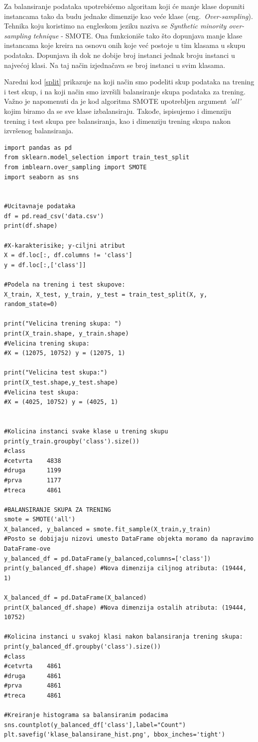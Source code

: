 \documentclass[a4paper]{article}
\begin{document}
Za balansiranje podataka upotrebićemo algoritam koji će manje klase dopuniti instancama tako da budu jednake dimenzije kao veće klase (eng.~{\em Over-sampling}). Tehnika koju koristimo na engleskom jeziku naziva se {\em Synthetic minority over-sampling tehnique} - SMOTE. Ona funkcioniše tako što dopunjava manje klase instancama koje kreira na osnovu onih koje već postoje u tim klasama u skupu podataka. Dopunjava ih dok ne dobije broj instanci jednak broju instanci u najvećoj klasi. Na taj način izjednačava se broj instanci u svim klasama.

Naredni kod \ref{split} prikazuje na koji način smo podeliti skup podataka na trening i test skup, i na koji način smo izvršili balansiranje skupa podataka za trening. Važno je napomenuti da je kod algoritma SMOTE upotrebljen argument {\em 'all'} kojim biramo da se sve klase izbalansiraju. Takođe, ispisujemo i dimenziju trening i test skupa pre balansiranja, kao i dimenziju trening skupa nakon izvršenog balansiranja.
\\

\begin{lstlisting}[caption={Podela na trening i test skupove i balansiranje skupa za trening},frame=single, label=split]
import pandas as pd
from sklearn.model_selection import train_test_split
from imblearn.over_sampling import SMOTE
import seaborn as sns


#Ucitavnaje podataka
df = pd.read_csv('data.csv')
print(df.shape)

#X-karakterisike; y-ciljni atribut
X = df.loc[:, df.columns != 'class']
y = df.loc[:,['class']]

#Podela na trening i test skupove:
X_train, X_test, y_train, y_test = train_test_split(X, y, random_state=0)

print("Velicina trening skupa: ")
print(X_train.shape, y_train.shape)
#Velicina trening skupa: 
#X = (12075, 10752) y = (12075, 1)

print("Velicina test skupa:")
print(X_test.shape,y_test.shape)
#Velicina test skupa:
#X = (4025, 10752) y = (4025, 1)


#Kolicina instanci svake klase u trening skupu
print(y_train.groupby('class').size())
#class
#cetvrta    4838
#druga      1199
#prva       1177
#treca      4861

#BALANSIRANJE SKUPA ZA TRENING
smote = SMOTE('all')
X_balanced, y_balanced = smote.fit_sample(X_train,y_train)
#Posto se dobijaju nizovi umesto DataFrame objekta moramo da napravimo DataFrame-ove
y_balanced_df = pd.DataFrame(y_balanced,columns=['class'])
print(y_balanced_df.shape) #Nova dimenzija ciljnog atributa: (19444, 1)

X_balanced_df = pd.DataFrame(X_balanced)
print(X_balanced_df.shape) #Nova dimenzija ostalih atributa: (19444, 10752)

#Kolicina instanci u svakoj klasi nakon balansiranja trening skupa:
print(y_balanced_df.groupby('class').size())
#class
#cetvrta    4861
#druga      4861
#prva       4861
#treca      4861

#Kreiranje histograma sa balansiranim podacima
sns.countplot(y_balanced_df['class'],label="Count")
plt.savefig('klase_balansirane_hist.png', bbox_inches='tight')
\end{lstlisting}
\end{document}
